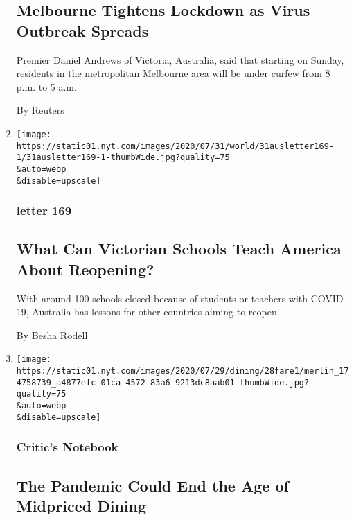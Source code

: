 \begin{enumerate}
{  \subsection{Melbourne Tightens Lockdown as Virus Outbreak
  Spreads}\label{melbourne-tightens-lockdown-as-virus-outbreak-spreads}}

  Premier Daniel Andrews of Victoria, Australia, said that starting on
  Sunday, residents in the metropolitan Melbourne area will be under
  curfew from 8 p.m. to 5 a.m.

  By Reuters
\item
  \href{/2020/07/30/world/australia/melbourne-schools-lessons-america.html}{}

  \texttt{[image: https://static01.nyt.com/images/2020/07/31/world/31ausletter169-1/31ausletter169-1-thumbWide.jpg?quality=75\\\&auto=webp\\\&disable=upscale]}

  \hypertarget{letter-169}{%
  \subsubsection{letter 169}\label{letter-169}}

  \hypertarget{what-can-victorian-schools-teach-america-about-reopening}{%
  \subsection{What Can Victorian Schools Teach America About
  Reopening?}\label{what-can-victorian-schools-teach-america-about-reopening}}

  With around 100 schools closed because of students or teachers with
  COVID-19, Australia has lessons for other countries aiming to reopen.

  By Besha Rodell
\item
  \href{/2020/07/28/dining/melbourne-restaurants-coronavirus.html}{}

  \texttt{[image: https://static01.nyt.com/images/2020/07/29/dining/28fare1/merlin\_174758739\_a4877efc-01ca-4572-83a6-9213dc8aab01-thumbWide.jpg?quality=75\\\&auto=webp\\\&disable=upscale]}

  \hypertarget{critics-notebook}{%
  \subsubsection{Critic's Notebook}\label{critics-notebook}}

  \hypertarget{the-pandemic-could-end-the-age-of-midpriced-dining}{%
  \subsection{The Pandemic Could End the Age of Midpriced
  Dining}\label{the-pandemic-could-end-the-age-of-midpriced-dining}}


\end{enumerate}
